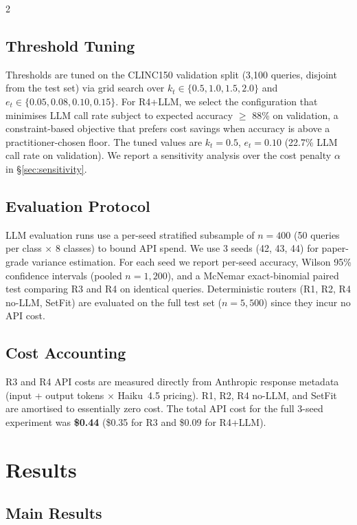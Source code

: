 \documentclass[11pt,a4paper]{article}
\begin{document}
\begin{multicols}{2}
\subsection{Threshold Tuning}

Thresholds are tuned on the CLINC150 validation split (3,100 queries, disjoint from the test set) via grid search over $k_t \in \{0.5, 1.0, 1.5, 2.0\}$ and $e_t \in \{0.05, 0.08, 0.10, 0.15\}$. For R4+LLM, we select the configuration that minimises LLM call rate subject to expected accuracy $\geq$ 88\% on validation, a constraint-based objective that prefers cost savings when accuracy is above a practitioner-chosen floor. The tuned values are $k_t = 0.5$, $e_t = 0.10$ (22.7\% LLM call rate on validation). We report a sensitivity analysis over the cost penalty $\alpha$ in \S\ref{sec:sensitivity}.

\subsection{Evaluation Protocol}

LLM evaluation runs use a per-seed stratified subsample of $n = 400$ (50 queries per class $\times$ 8 classes) to bound API spend. We use 3 seeds (42, 43, 44) for paper-grade variance estimation. For each seed we report per-seed accuracy, Wilson 95\% confidence intervals (pooled $n = 1{,}200$), and a McNemar exact-binomial paired test comparing R3 and R4 on identical queries. Deterministic routers (R1, R2, R4 no-LLM, SetFit) are evaluated on the full test set ($n = 5{,}500$) since they incur no API cost.

\subsection{Cost Accounting}

R3 and R4 API costs are measured directly from Anthropic response metadata (input + output tokens $\times$ Haiku~4.5 pricing). R1, R2, R4 no-LLM, and SetFit are amortised to essentially zero cost. The total API cost for the full 3-seed experiment was \textbf{\$0.44} (\$0.35 for R3 and \$0.09 for R4+LLM).

\section{Results}

\subsection{Main Results}


\end{multicols}
\end{document}
